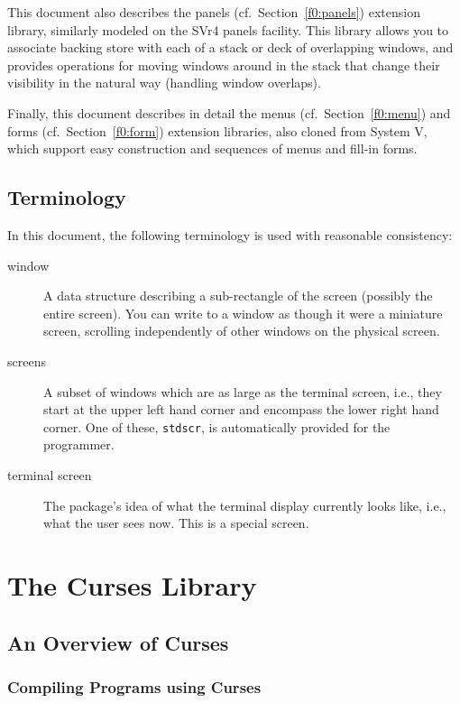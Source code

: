 This document also describes the panels (cf.\ Section~\ref{f0:panels}) extension library,
similarly modeled on the SVr4 panels facility.  This library allows you to
associate backing store with each of a stack or deck of overlapping windows,
and provides operations for moving windows around in the stack that change
their visibility in the natural way (handling window overlaps). 

Finally, this document describes in detail the menus (cf.\ Section~\ref{f0:menu}) and forms (cf.\ Section~\ref{f0:form}) extension libraries, also cloned from System V,
which support easy construction and sequences of menus and fill-in
forms.

\section{Terminology}

\label{f0:terminology}In this document, the following terminology is used with reasonable
consistency:
\begin{description}
\item[ window] 
A data structure describing a sub-rectangle of the screen (possibly the
entire screen).  You can write to a window as though it were a miniature
screen, scrolling independently of other windows on the physical screen.
\item[ screens] 
A subset of windows which are as large as the terminal screen, i.e., they start
at the upper left hand corner and encompass the lower right hand corner.  One
of these, \texttt{stdscr}, is automatically provided for the programmer.
\item[ terminal screen] 
The package's idea of what the terminal display currently looks like, i.e.,
what the user sees now.  This is a special screen.
\end{description}

\chapter{The Curses Library}

\label{f0:curses}
\section{An Overview of Curses}

\label{f0:overview}
\subsection{Compiling Programs using Curses}

